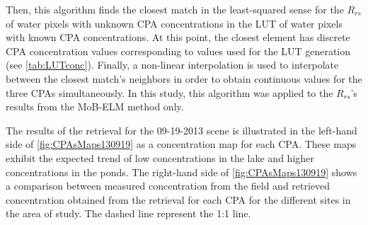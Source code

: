 Then, this algorithm finds the closest match in the least-squared sense for the $R_{rs}$ of water pixels with unknown CPA concentrations in the LUT of water pixels with known CPA concentrations. At this point, the closest element has discrete CPA concentration values corresponding to values used for the LUT generation (see \autoref{tab:LUTconc}). Finally, a non-linear interpolation is used to interpolate between the closest match's neighbors in order to obtain continuous values for the three CPAs simultaneously. In this study, this algorithm was applied to the $R_{rs}$'s results from the MoB-ELM method only.

The results of the retrieval for the 09-19-2013 scene is illustrated in the left-hand side of \autoref{fig:CPAsMaps130919} as a concentration map for each CPA. These maps exhibit the expected trend of low concentrations in the lake and higher concentrations in the ponds. The right-hand side of \autoref{fig:CPAsMaps130919} shows a comparison between measured concentration from the field and retrieved concentration obtained from the retrieval for each CPA for the different sites in the area of study. The dashed line represent the 1:1 line. 

